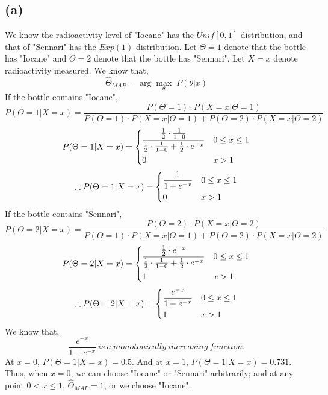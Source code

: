 \documentclass{article}
\begin{document}
\subsection*{(a)}
	We know the radioactivity level of "Iocane" has the $Unif[0,1]$ distribution, and that of "Sennari" has the $Exp(1)$ distribution. \hfill \hfill \linebreak
	Let $\Theta = 1$ denote that the bottle has "Iocane" and $\Theta = 2$ denote that the bottle has "Sennari". \hfill \hfill \linebreak
	Let $X=x$ denote radioactivity measured. \hfill \hfill \linebreak
	We know that,
	$$ \hat\Theta_{MAP} = \arg \max_\theta \; P(\theta | x) $$
	If the bottle contains "Iocane",
	$$ P(\Theta = 1 | X = x) = \frac{P(\Theta = 1) \cdot P(X=x|\Theta = 1)}{P(\Theta = 1) \cdot P(X=x|\Theta = 1)+P(\Theta = 2) \cdot P(X=x|\Theta = 2)}$$
	$$ P(\Theta = 1 | X = x) =  \begin{dcases}
		\frac{\frac{1}{2}\cdot \frac{1}{1-0}}{\frac{1}{2}\cdot \frac{1}{1-0}+\frac{1}{2}\cdot e^{-x}} & 0 \leq x \leq 1 \\
		0 & x >1 
		\end{dcases}
	$$
	$$ \therefore P(\Theta = 1 | X = x) =  \begin{dcases}
		\frac{1}{1+e^{-x}} & 0 \leq x \leq 1 \\
		0 &  x > 1
		\end{dcases}
	$$
\linebreak
	If the bottle contains "Sennari",
	$$ P(\Theta = 2 | X = x) = \frac{P(\Theta = 2) \cdot P(X=x|\Theta = 2)}{P(\Theta = 1) \cdot P(X=x|\Theta = 1)+P(\Theta = 2) \cdot P(X=x|\Theta = 2)}$$
	$$ P(\Theta = 2 | X = x) =  \begin{dcases}
		\frac{\frac{1}{2}\cdot e^{-x}}{\frac{1}{2}\cdot \frac{1}{1-0}+\frac{1}{2}\cdot e^{-x}} & 0 \leq x \leq 1 \\
		1 & x >1 
		\end{dcases}
	$$
	$$ \therefore P(\Theta = 2 | X = x) =  \begin{dcases}
		\frac{e^{-x}}{1+e^{-x}} & 0 \leq x \leq 1 \\
		1 &  x > 1
		\end{dcases}
	$$
	We know that,
	$$ \frac{e^{-x}}{1+e^{-x}} \ is\ a\ monotonically\ increasing\ function. $$
	At $x=0$, $ P(\Theta = 1 | X = x)  = 0.5$. And at $x=1$, $ P(\Theta = 1 | X = x) = 0.731 $. Thus, when $x=0$, we can choose "Iocane" or "Sennari" arbitrarily; and at any point $0<x\leq 1$, $ \hat\Theta_{MAP}=1$, or we choose "Iocane".
\linebreak
\end{document}
